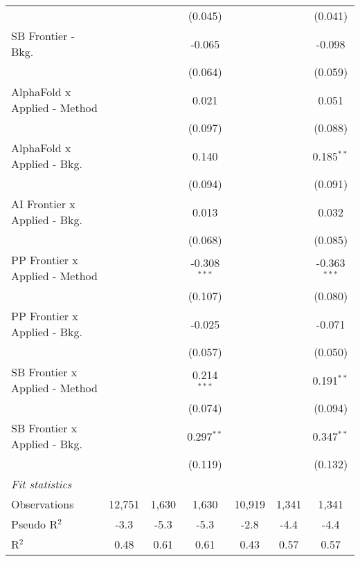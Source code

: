 \begin{tabular}{lcccccc}
                                  &             &         & (0.045)        &              &              & (0.041)\\   
   SB Frontier - Bkg.             &             &         & -0.065         &              &              & -0.098\\   
                                  &             &         & (0.064)        &              &              & (0.059)\\   
   AlphaFold x Applied - Method   &             &         & 0.021          &              &              & 0.051\\   
                                  &             &         & (0.097)        &              &              & (0.088)\\   
   AlphaFold x Applied - Bkg.     &             &         & 0.140          &              &              & 0.185$^{**}$\\   
                                  &             &         & (0.094)        &              &              & (0.091)\\   
   AI Frontier x Applied - Bkg.   &             &         & 0.013          &              &              & 0.032\\   
                                  &             &         & (0.068)        &              &              & (0.085)\\   
   PP Frontier x Applied - Method &             &         & -0.308$^{***}$ &              &              & -0.363$^{***}$\\   
                                  &             &         & (0.107)        &              &              & (0.080)\\   
   PP Frontier x Applied - Bkg.   &             &         & -0.025         &              &              & -0.071\\   
                                  &             &         & (0.057)        &              &              & (0.050)\\   
   SB Frontier x Applied - Method &             &         & 0.214$^{***}$  &              &              & 0.191$^{**}$\\   
                                  &             &         & (0.074)        &              &              & (0.094)\\   
   SB Frontier x Applied - Bkg.   &             &         & 0.297$^{**}$   &              &              & 0.347$^{**}$\\   
                                  &             &         & (0.119)        &              &              & (0.132)\\   
   \midrule
   \emph{Fit statistics}\\
   Observations                   & 12,751      & 1,630   & 1,630          & 10,919       & 1,341        & 1,341\\  
   Pseudo R$^2$                   & -3.3        & -5.3    & -5.3           & -2.8         & -4.4         & -4.4\\  
   R$^2$                          & 0.48        & 0.61    & 0.61           & 0.43         & 0.57         & 0.57\\  
   

\end{tabular}

